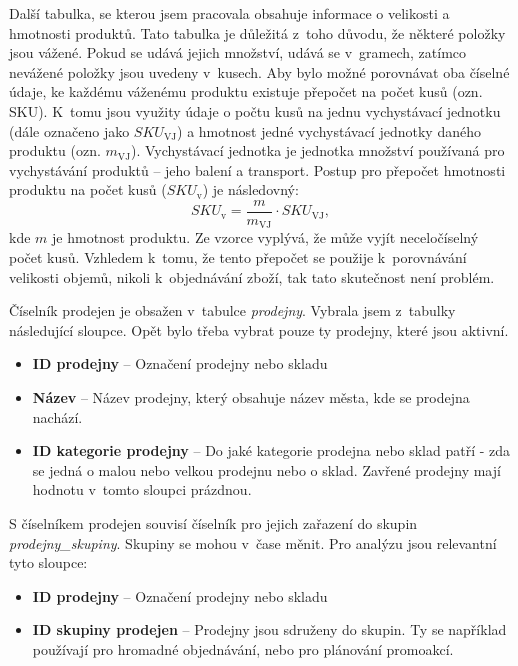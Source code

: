 Další tabulka, se kterou jsem pracovala obsahuje informace o velikosti a hmotnosti produktů. Tato tabulka je důležitá z~toho důvodu, že některé položky jsou vážené. Pokud se udává jejich množství, udává se v~gramech, zatímco nevážené položky jsou uvedeny v~kusech. Aby bylo možné porovnávat oba číselné údaje, ke každému váženému produktu existuje přepočet na počet kusů (ozn. SKU). K~tomu jsou využity údaje o počtu kusů na jednu vychystávací jednotku (dále označeno jako $SKU_{\mathrm{VJ}}$) a hmotnost jedné vychystávací jednotky daného produktu (ozn. $m_{\mathrm{VJ}}$). Vychystávací jednotka je jednotka množství používaná pro vychystávání produktů -- jeho balení a transport. Postup pro přepočet hmotnosti produktu na počet kusů ($SKU_{\mathrm{v}}$) je následovný: $$SKU_{\mathrm{v}} = \frac{m}{m_{\mathrm{VJ}}} \cdot SKU_{\mathrm{VJ}},$$
kde $m$ je hmotnost produktu. Ze vzorce vyplývá, že může vyjít neceločíselný počet kusů. Vzhledem k~tomu, že tento přepočet se použije k~porovnávání velikosti objemů, nikoli k~objednávání zboží, tak tato skutečnost není problém.



Číselník prodejen je obsažen v~tabulce \emph{prodejny}. Vybrala jsem z~tabulky následující sloupce. Opět bylo třeba vybrat pouze ty prodejny, které jsou aktivní.
\begin{itemize}
    \itemsep0em 
    \item \textbf{ID prodejny} -- Označení prodejny nebo skladu
    \item \textbf{Název} -- Název prodejny, který obsahuje název města, kde se prodejna nachází.
    \item \textbf{ID kategorie prodejny} -- Do jaké kategorie prodejna nebo sklad patří - zda se jedná o malou nebo velkou prodejnu nebo o sklad. Zavřené prodejny mají hodnotu v~tomto sloupci prázdnou.
\end{itemize}

S číselníkem prodejen souvisí číselník pro jejich zařazení do skupin \emph{prodejny\_skupiny}. Skupiny se mohou v~čase měnit. Pro analýzu jsou relevantní tyto sloupce:
\begin{itemize}
    \itemsep0em 
    \item \textbf{ID prodejny} -- Označení prodejny nebo skladu
    \item \textbf{ID skupiny prodejen} -- Prodejny jsou sdruženy do skupin. Ty se například používají pro hromadné objednávání, nebo pro plánování promoakcí. 
\end{itemize}    

